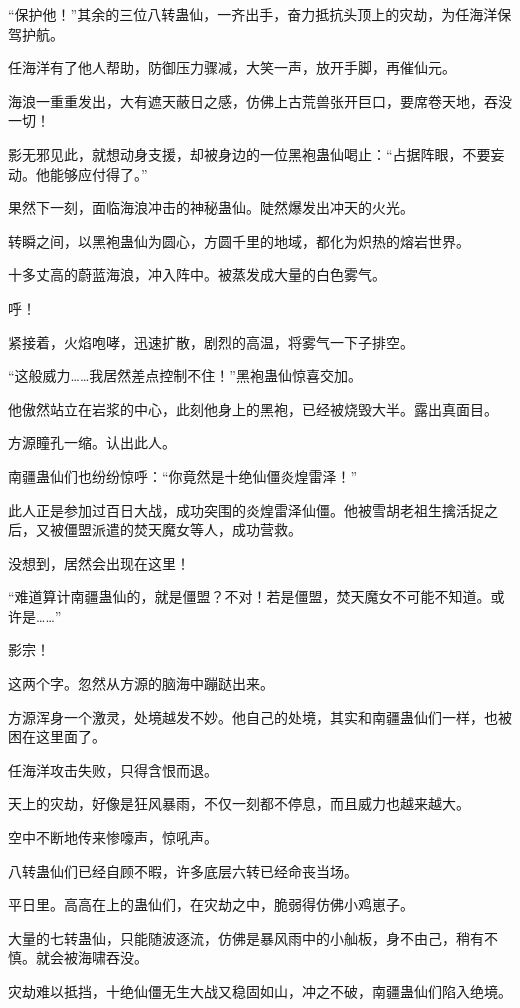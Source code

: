 \begin{this_body}
“保护他！”其余的三位八转蛊仙，一齐出手，奋力抵抗头顶上的灾劫，为任海洋保驾护航。

任海洋有了他人帮助，防御压力骤减，大笑一声，放开手脚，再催仙元。

海浪一重重发出，大有遮天蔽日之感，仿佛上古荒兽张开巨口，要席卷天地，吞没一切！

影无邪见此，就想动身支援，却被身边的一位黑袍蛊仙喝止：“占据阵眼，不要妄动。他能够应付得了。”

果然下一刻，面临海浪冲击的神秘蛊仙。陡然爆发出冲天的火光。

转瞬之间，以黑袍蛊仙为圆心，方圆千里的地域，都化为炽热的熔岩世界。

十多丈高的蔚蓝海浪，冲入阵中。被蒸发成大量的白色雾气。

呼！

紧接着，火焰咆哮，迅速扩散，剧烈的高温，将雾气一下子排空。

“这般威力……我居然差点控制不住！”黑袍蛊仙惊喜交加。

他傲然站立在岩浆的中心，此刻他身上的黑袍，已经被烧毁大半。露出真面目。

方源瞳孔一缩。认出此人。

南疆蛊仙们也纷纷惊呼：“你竟然是十绝仙僵炎煌雷泽！”

此人正是参加过百日大战，成功突围的炎煌雷泽仙僵。他被雪胡老祖生擒活捉之后，又被僵盟派遣的焚天魔女等人，成功营救。

没想到，居然会出现在这里！

“难道算计南疆蛊仙的，就是僵盟？不对！若是僵盟，焚天魔女不可能不知道。或许是……”

影宗！

这两个字。忽然从方源的脑海中蹦跶出来。

方源浑身一个激灵，处境越发不妙。他自己的处境，其实和南疆蛊仙们一样，也被困在这里面了。

任海洋攻击失败，只得含恨而退。

天上的灾劫，好像是狂风暴雨，不仅一刻都不停息，而且威力也越来越大。

空中不断地传来惨嚎声，惊吼声。

八转蛊仙们已经自顾不暇，许多底层六转已经命丧当场。

平日里。高高在上的蛊仙们，在灾劫之中，脆弱得仿佛小鸡崽子。

大量的七转蛊仙，只能随波逐流，仿佛是暴风雨中的小舢板，身不由己，稍有不慎。就会被海啸吞没。

灾劫难以抵挡，十绝仙僵无生大战又稳固如山，冲之不破，南疆蛊仙们陷入绝境。


\end{this_body}
